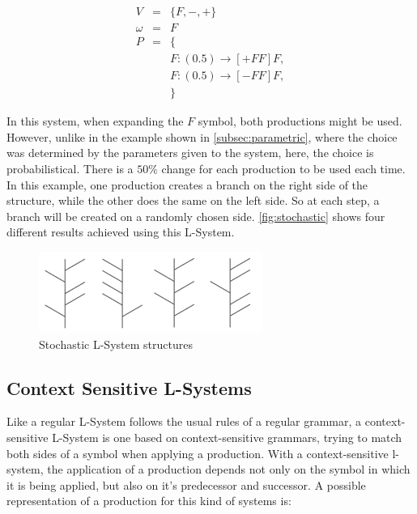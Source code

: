 \documentclass{acmtog}
\begin{document}
\begin{eqnarray*}
  V       &=& \{F, -, +\}                   \\
  \omega  &=& F                             \\
  P       &=& \{                            \\
          & & F : (0.5) \rightarrow [+FF]F, \\
          & & F : (0.5) \rightarrow [-FF]F, \\
          & & \}                            
  \label{eq:example4}
\end{eqnarray*}

In this system, when expanding the $F$ symbol, both productions might be used. However, unlike in the example shown in \autoref{subsec:parametric}, where the choice was determined by the parameters given to the system, here, the choice is probabilistical. There is a $50\%$ change for each production to be used each time. In this example, one production creates a branch on the right side of the structure, while the other does the same on the left side. So at each step, a branch will be created on a randomly chosen side. \autoref{fig:stochastic} shows four different results achieved using this L-System.

\begin{figure}[!htp]
  \begin{center}
    \includegraphics[width=0.6\columnwidth]{images/4_stochastic}
    \caption{Stochastic L-System structures \label{fig:stochastic}}
    \end{center}
\end{figure}

\subsection{Context Sensitive L-Systems}
\label{subsec:context}

Like a regular L-System follows the usual rules of a regular grammar, a context-sensitive L-System is one based on context-sensitive grammars, trying to match both sides of a symbol when applying a production. With a context-sensitive l-system, the application of a production depends not only on the symbol in which it is being applied, but also on it's predecessor and successor. A possible representation of a production for this kind of systems is:
\end{document}
